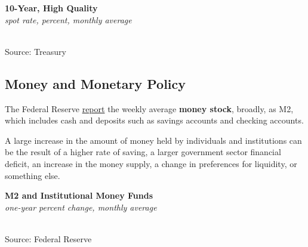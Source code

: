 \documentclass{report}
\makeatletter
\newcommand{\tbllink}[1]{\href{https://raw.githubusercontent.com/bdecon/US-chartbook/master/chartbook/data/#1}{\faTable}}
\newcommand*\short[1]{\expandafter\@gobbletwo\number\numexpr#1\relax}
\newcommand{\dateaxisticks}{
		date coordinates in=x, axis line style={draw=none},
		xmax={2021-05-15},
		max space between ticks=40,	    
		xtick={{1990-01-01}, {1992-01-01}, {1994-01-01}, 
			{1996-01-01}, {1998-01-01}, {2000-01-01}, 
			{2002-01-01}, {2004-01-01}, {2006-01-01},
			{2008-01-01}, {2010-01-01}, {2012-01-01}, {2014-01-01},
		    {2016-01-01}, {2018-01-01}, {2020-01-01}},
		minor xtick={{1989-01-01}, {1991-01-01}, {1993-01-01},
			{1995-01-01}, {1997-01-01}, {1999-01-01}, 
			{2001-01-01}, {2003-01-01}, {2005-01-01}, {2007-01-01},
		    {2009-01-01}, {2011-01-01}, {2013-01-01}, {2015-01-01},
		    {2017-01-01}, {2019-01-01}, {2021-01-01}},
		enlarge y limits={0.06}, enlarge x limits={0.01},
		}
\newcommand{\shdateaxisticks}{
		date coordinates in=x, axis line style={draw=none},
		xmax={2021-05-15},
		max space between ticks=40,	    
		xtick={{1990-01-01}, {1995-01-01}, {2000-01-01}, 
			{2005-01-01}, {2010-01-01}, {2015-01-01}, {2020-01-01}},
		minor xtick={},
		enlarge y limits={0.06}, enlarge x limits={0.01},
		}
\newcommand{\bbar}[2]{extra #1 ticks = {{#2}}, extra #1 tick labels = ,
		extra #1 tick style = {grid=major, grid style={thick, black!25}},}
\newcommand{\stdline}[4]{\addplot[very thick, no markers, color=#1] 
		table [x=#2, y=#3, col sep=comma] {#4};	}
\newcommand{\thickline}[4]{\addplot[ultra thick, no markers, color=#1] 
		table [x=#2, y=#3, col sep=comma] {#4};	}
\newcommand{\rbars}{
		\fill[color=black!10] (axis cs:{1990-07-01},\pgfkeysvalueof{/pgfplots/ymin}) rectangle 
			(axis cs:{1991-03-01}, \pgfkeysvalueof{/pgfplots/ymax});
		\fill[color=black!10] (axis cs:{2007-12-01},\pgfkeysvalueof{/pgfplots/ymin}) rectangle 
			(axis cs:{2009-07-01}, \pgfkeysvalueof{/pgfplots/ymax});
		\fill[color=black!10] (axis cs:{2001-03-01},\pgfkeysvalueof{/pgfplots/ymin}) rectangle 
			(axis cs:{2001-11-01}, \pgfkeysvalueof{/pgfplots/ymax});
		\fill[color=black!10] (axis cs:{2020-02-01},\pgfkeysvalueof{/pgfplots/ymin}) rectangle 
			(axis cs:{2021-05-15}, \pgfkeysvalueof{/pgfplots/ymax});}
\makeatother
\begin{document}
{{\begin{minipage}{0.27\textwidth}
\end{minipage}\hspace{8mm} \begin{minipage}{0.43\textwidth}
\normalsize \textbf{10-Year, High Quality}\\
\footnotesize{\textit{spot rate, percent, monthly average}}\\
\hspace*{-2mm} \\
\footnotesize{Source: Treasury} \hfill \tbllink{hqcb.csv}
\end{minipage}
\newpage
\begin{minipage}{0.76\textwidth}
\subsection*{\color{black!70} \seriffont Money and Monetary Policy}
\small The Federal Reserve \href{https://www.federalreserve.gov/releases/h6/current/default.htm}{report} the weekly average \textbf{money stock}, broadly, as M2, which includes cash and deposits such as savings accounts and checking accounts. 

A large increase in the amount of money held by individuals and institutions can be the result of a higher rate of saving, a larger government sector financial deficit, an increase in the money supply, a change in preferences for liquidity, or something else. 
\vspace{2mm}

\normalsize \textbf{M2 and Institutional Money Funds}\\
\footnotesize{\textit{one-year percent change, monthly average}}\\
\hspace*{-2mm} \\
\footnotesize{Source: Federal Reserve} \hfill \tbllink{M2imf.csv}
\end{minipage}
\newpage
\begin{minipage}{0.76\textwidth}

\end{minipage}}}
\end{document}
